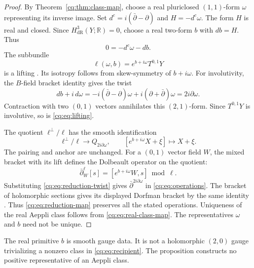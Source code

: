 \begin{proof}
By Theorem~\ref{cq:thm:class-map}, choose a real
pluriclosed $(1,1)$-form $\omega$ representing its inverse image.
Set $d^c=i(\bar\partial-\partial)$ and $H=-d^c\omega$.
The form $H$ is real and closed.
Since $H_{\mathrm{dR}}^3(Y;\mathbb R)=0$, choose a real
two-form $b$ with $db=H$. Thus
\begin{equation}\label{cq:eq:untwisting}
                         0=-d^c\omega-db.
\end{equation}
The subbundle
\begin{equation}\label{cq:eq:lifting}
                    \ell(\omega,b)=e^{b+i\omega}T^{0,1}Y
\end{equation}
is a lifting \cite[Lemma~3.6]{GFJSCourant}.
Its isotropy follows from skew-symmetry of $b+i\omega$.
For involutivity, the $B$-field bracket identity gives the twist
\begin{equation}\label{cq:eq:reduction-twist}
 db+i\,d\omega
     =-i(\bar\partial-\partial)\omega
                         +i(\partial+\bar\partial)\omega
     =2i\partial\omega.
\end{equation}
Contraction with two $(0,1)$ vectors annihilates this $(2,1)$-form.
Since $T^{0,1}Y$ is involutive, so is \eqref{cq:eq:lifting}.

The quotient $\ell^\perp/\ell$ has the smooth identification
\begin{equation}\label{cq:eq:reduction-map}
 \ell^\perp/\ell\longrightarrow Q_{2i\partial\omega},\qquad
                   [e^{b+i\omega}X+\xi]\longmapsto X+\xi.
\end{equation}
The pairing and anchor are unchanged.
For a $(0,1)$ vector field $W$, the mixed bracket with its lift
defines the Dolbeault operator on the quotient:
\[
        \bar\partial^\ell_W[s]=[e^{b+i\omega}W,s]\bmod\ell.
\]
Substituting \eqref{cq:eq:reduction-twist} gives
$\bar\partial^{2i\partial\omega}$ in \eqref{cq:eq:operations}.
The bracket of holomorphic sections gives its displayed Dorfman
bracket by the same identity
\cite[Lemma~3.8]{GFJSCourant}.
Thus \eqref{cq:eq:reduction-map} preserves all the stated operations.
Uniqueness of the real Aeppli class follows from
\eqref{cq:eq:real-class-map}. The representatives $\omega$ and $b$
need not be unique.
\end{proof}

The real primitive $b$ is smooth gauge data.
It is not a holomorphic $(2,0)$ gauge trivializing a nonzero
class in \eqref{cq:eq:recipient}.
The proposition constructs no positive representative of an
Aeppli class.

